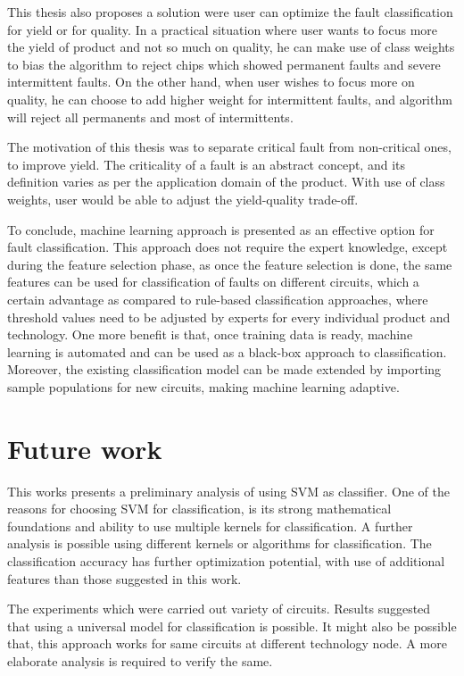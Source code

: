This thesis also proposes a solution were user can optimize the fault classification for yield or for quality. In a practical situation where user wants to focus more the yield of product and not so much on quality, he can make use of class weights to bias the algorithm to reject chips which showed permanent faults and severe intermittent faults. On the other hand, when user wishes to focus more on quality, he can choose to add higher weight for intermittent faults, and algorithm will reject all permanents and most of intermittents.

The motivation of this thesis was to separate critical fault from non-critical ones, to improve yield. The criticality of a fault is an abstract concept, and its definition varies as per the application domain of the product. With use of class weights, user would be able to adjust the yield-quality trade-off.

To conclude, machine learning approach is presented as an effective option for fault classification. This approach does not require the expert knowledge, except during the feature selection phase, as once the feature selection is done, the same features can be used for classification of faults on different circuits, which a certain advantage as compared to rule-based classification approaches, where threshold values need to be adjusted by experts for every individual product and technology. One more benefit is that, once training data is ready, machine learning is automated and can be used as a black-box approach to classification. Moreover, the existing classification model can be made extended by importing sample populations for new circuits, making machine learning adaptive. 

\section{Future work}

This works presents a preliminary analysis of using SVM as classifier. One of the reasons for choosing SVM for classification, is its strong mathematical foundations \cite{Vapnik1995, Ben-Hur2010} and ability to use multiple kernels for classification. A further analysis is possible using different kernels or algorithms for classification. The classification accuracy has further optimization potential, with use of additional features than those suggested in this work.

The experiments which were carried out variety of circuits. Results suggested that using a universal model for classification is possible. It might also be possible that, this approach works for same circuits at different technology node. A more elaborate analysis is required to verify the same.

